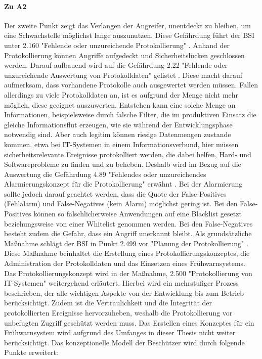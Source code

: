 \documentclass[11pt,a4paper]{report}
\begin{document}
\paragraph{Zu A2} Der zweite Punkt zeigt das Verlangen der Angreifer, unentdeckt zu bleiben, um eine Schwachstelle möglichst lange auszunutzen. Diese Gefährdung führt der BSI unter 2.160 "Fehlende oder unzureichende Protokollierung" \cite{bsi_g2160}. Anhand der Protokollierung können Angriffe aufgedeckt und Sicherheitslücken geschlossen werden. Darauf aufbauend wird auf die Gefährdung 2.22 "Fehlende oder unzureichende Auswertung von Protokolldaten" gelistet \cite{bsi_g2022}. Diese macht darauf aufmerksam, dass vorhandene Protokolle auch ausgewertet werden müssen. Fallen allerdings zu viele Protokolldaten an, ist es aufgrund der Menge nicht mehr möglich, diese geeignet auszuwerten. Entstehen kann eine solche Menge an Informationen, beispielsweise durch falsche Filter, die im produktiven Einsatz die gleiche Informationsflut erzeugen, wie sie während der Entwicklungsphase notwendig sind. Aber auch legitim können riesige Datenmengen zustande kommen, etwa bei IT-Systemen in einem Informationsverbund, hier müssen sicherheitsrelevante Ereignisse protokolliert werden, die dabei helfen, Hard- und Softwareprobleme zu finden und zu beheben. Deshalb wird im Bezug auf die Auswertung die Gefährdung 4.89 "Fehlendes oder unzureichendes Alarmierungskonzept für die Protokollierung" erwähnt \cite{bsi_g4089}. Bei der Alarmierung sollte jedoch darauf geachtet werden, dass die Quote der False-Positives (Fehlalarm) und False-Negatives (kein Alarm) möglichst gering ist. Bei den False-Positives können so fälschlicherweise Anwendungen auf eine Blacklist gesetzt beziehungsweise von einer Whitelist genommen werden. Bei den False-Negatives besteht zudem die Gefahr, dass ein Angriff unerkannt bleibt. Als grundsätzliche Maßnahme schlägt der BSI in Punkt 2.499 vor "Planung der Protokollierung" \cite{bsi_m2499}. Diese Maßnahme beinhaltet die Erstellung eines Protokollierungskonzeptes, die Administration der Protokolldaten und das Einsetzen eines Frühwarnsystems. Das Protokollierungskonzept wird in der Maßnahme, 2.500 "Protokollierung von IT-Systemen" weitergehend erläutert. Hierbei wird ein mehrstufiger Prozess beschrieben, der alle wichtigen Aspekte von der Entwicklung bis zum Betrieb berücksichtigt. Zudem ist die Vertraulichkeit und die Integrität der protokollierten Ereignisse hervorzuheben, weshalb die Protokollierung vor unbefugten Zugriff geschützt werden muss. Das Erstellen eines Konzeptes für ein Frühwarnsystem wird aufgrund des Umfanges in dieser Thesis nicht weiter berücksichtigt.  Das konzeptionelle Modell der Beschützer wird durch folgende Punkte erweitert:
\end{document}

